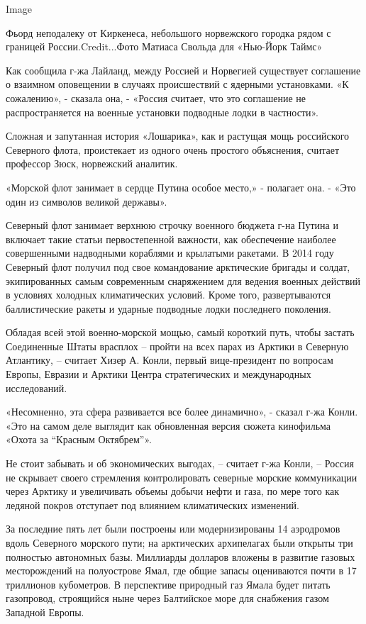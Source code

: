 Image

Фьорд неподалеку от Киркенеса, небольшого норвежского городка рядом с
границей России.Credit...Фото Матиаса Свольда для «Нью-Йорк Таймс»

Как сообщила г-жа Лайланд, между Россией и Норвегией существует
соглашение о взаимном оповещении в случаях происшествий с ядерными
установками. «К сожалению», - сказала она, - «Россия считает, что это
соглашение не распространяется на военные установки подводные лодки в
частности».

Сложная и запутанная история «Лошарика», как и растущая мощь российского
Северного флота, проистекает из одного очень простого объяснения,
считает профессор Зюск, норвежский аналитик.

«Морской флот занимает в сердце Путина особое место,» - полагает она. -
«Это один из символов великой державы».

Северный флот занимает верхнюю строчку военного бюджета г-на Путина и
включает такие статьи первостепенной важности, как обеспечение наиболее
совершенными надводными кораблями и крылатыми ракетами. В 2014 году
Северный флот получил под свое командование арктические бригады и
солдат, экипированных самым современным снаряжением для ведения военных
действий в условиях холодных климатических условий. Кроме того,
развертываются баллистические ракеты и ударные подводные лодки
последнего поколения.

Обладая всей этой военно-морской мощью, самый короткий путь, чтобы
застать Соединенные Штаты врасплох -- пройти на всех парах из Арктики в
Северную Атлантику, -- считает Хизер А. Конли, первый вице-президент по
вопросам Европы, Евразии и Арктики Центра стратегических и международных
исследований.

«Несомненно, эта сфера развивается все более динамично», - сказал г-жа
Конли. «Это на самом деле выглядит как обновленная версия сюжета
кинофильма «Охота за ``Красным Октябрем''».

Не стоит забывать и об экономических выгодах, -- считает г-жа Конли, --
Россия не скрывает своего стремления контролировать северные морские
коммуникации через Арктику и увеличивать объемы добычи нефти и газа, по
мере того как ледяной покров отступает под влиянием климатических
изменений.

За последние пять лет были построены или модернизированы 14 аэродромов
вдоль Северного морского пути; на арктических архипелагах были открыты
три полностью автономных базы. Миллиарды долларов вложены в развитие
газовых месторождений на полуострове Ямал, где общие запасы оцениваются
почти в 17 триллионов кубометров. В перспективе природный газ Ямала
будет питать газопровод, строящийся ныне через Балтийское море для
снабжения газом Западной Европы.

